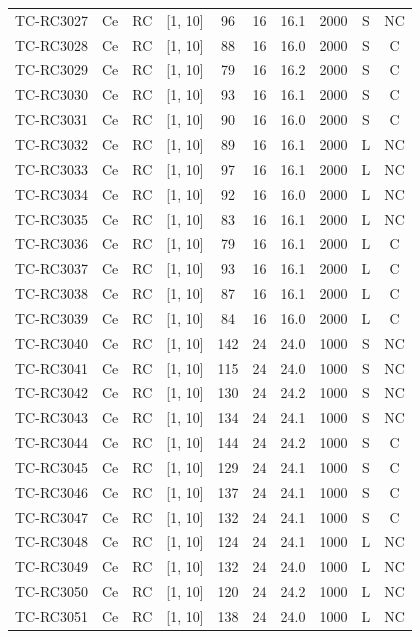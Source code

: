 \begin{longtable}{lccccccccc}
TC-RC3027 & Ce & RC & [1, 10] & 96 & 16 & 16.1 & 2000 & S & NC \\
TC-RC3028 & Ce & RC & [1, 10] & 88 & 16 & 16.0 & 2000 & S & C \\
TC-RC3029 & Ce & RC & [1, 10] & 79 & 16 & 16.2 & 2000 & S & C \\
TC-RC3030 & Ce & RC & [1, 10] & 93 & 16 & 16.1 & 2000 & S & C \\
TC-RC3031 & Ce & RC & [1, 10] & 90 & 16 & 16.0 & 2000 & S & C \\
TC-RC3032 & Ce & RC & [1, 10] & 89 & 16 & 16.1 & 2000 & L & NC \\
TC-RC3033 & Ce & RC & [1, 10] & 97 & 16 & 16.1 & 2000 & L & NC \\
TC-RC3034 & Ce & RC & [1, 10] & 92 & 16 & 16.0 & 2000 & L & NC \\
TC-RC3035 & Ce & RC & [1, 10] & 83 & 16 & 16.1 & 2000 & L & NC \\
TC-RC3036 & Ce & RC & [1, 10] & 79 & 16 & 16.1 & 2000 & L & C \\
TC-RC3037 & Ce & RC & [1, 10] & 93 & 16 & 16.1 & 2000 & L & C \\
TC-RC3038 & Ce & RC & [1, 10] & 87 & 16 & 16.1 & 2000 & L & C \\
TC-RC3039 & Ce & RC & [1, 10] & 84 & 16 & 16.0 & 2000 & L & C \\
TC-RC3040 & Ce & RC & [1, 10] & 142 & 24 & 24.0 & 1000 & S & NC \\
TC-RC3041 & Ce & RC & [1, 10] & 115 & 24 & 24.0 & 1000 & S & NC \\
TC-RC3042 & Ce & RC & [1, 10] & 130 & 24 & 24.2 & 1000 & S & NC \\
TC-RC3043 & Ce & RC & [1, 10] & 134 & 24 & 24.1 & 1000 & S & NC \\
TC-RC3044 & Ce & RC & [1, 10] & 144 & 24 & 24.2 & 1000 & S & C \\
TC-RC3045 & Ce & RC & [1, 10] & 129 & 24 & 24.1 & 1000 & S & C \\
TC-RC3046 & Ce & RC & [1, 10] & 137 & 24 & 24.1 & 1000 & S & C \\
TC-RC3047 & Ce & RC & [1, 10] & 132 & 24 & 24.1 & 1000 & S & C \\
TC-RC3048 & Ce & RC & [1, 10] & 124 & 24 & 24.1 & 1000 & L & NC \\
TC-RC3049 & Ce & RC & [1, 10] & 132 & 24 & 24.0 & 1000 & L & NC \\
TC-RC3050 & Ce & RC & [1, 10] & 120 & 24 & 24.2 & 1000 & L & NC \\
TC-RC3051 & Ce & RC & [1, 10] & 138 & 24 & 24.0 & 1000 & L & NC \\

\end{longtable}
